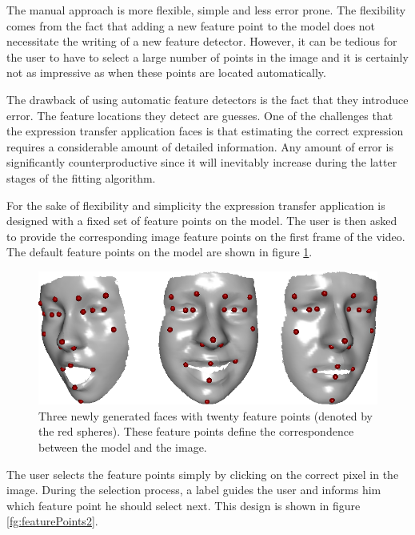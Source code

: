 \documentclass[11pt,a4paper,twoside]{report}
\begin{document}
The manual approach is more flexible, simple and less error prone. The
flexibility comes from the fact that adding a new feature point to the model
does not necessitate the writing of a new feature detector. However, it can be
tedious for the user to have to select a large number of points in the image and
it is certainly not as impressive as when these points are located
automatically. 

The drawback of using automatic feature detectors is the fact that they
introduce error. The feature locations they detect are guesses. One of the
challenges that the expression transfer application faces is that estimating the
correct expression requires a considerable amount of detailed information. Any amount of error is
significantly counterproductive since it will inevitably increase during the
latter stages of the fitting algorithm.

For the sake of flexibility and simplicity the expression transfer application
is designed with a fixed set of feature points on the model. The user is then
asked to provide the corresponding image feature points on the first frame of the
video. The default feature points on the model are shown in figure
\ref{fg:featurePoints}.

\begin{figure}[H]
\begin{centering}
\includegraphics[scale=0.45]{images/featurePoints.png}
\par\end{centering}

\caption{Three newly generated faces with twenty feature points (denoted by the
  red spheres). These feature points define the correspondence between the model
  and the image.}
\label{fg:featurePoints}
\end{figure}

The user selects the feature points simply by clicking on the correct pixel in
the image. During the selection process, a label guides the user and informs
him which feature point he should select next. This design is shown in figure
\ref{fg:featurePoints2}.
\end{document}
